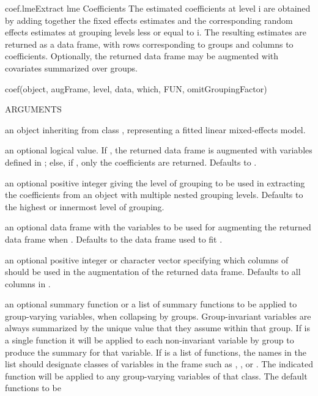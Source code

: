 \documentclass[pdftex]{article} \usepackage{url,graphicx}
\begin{document}
\begin{Helpfile}{coef.lme}{Extract lme Coefficients}
The estimated coefficients at level i are obtained by adding
together the fixed effects estimates and the corresponding random
effects estimates at grouping levels less or equal to i. The
resulting estimates are returned as a data frame, with rows
corresponding to groups and columns to coefficients. Optionally, the
returned data frame may be augmented with covariates summarized over
groups.
\begin{Example}
coef(object, augFrame, level, data, which, FUN, omitGroupingFactor)
\end{Example}
\begin{Argument}{ARGUMENTS}
\item[\Co{object:}]
an object inheriting from class , representing
a fitted linear mixed-effects model.
\item[\Co{augFrame:}]
an optional logical value. If , the returned
data frame is augmented with variables defined in ; else,
if , only the coefficients are returned. Defaults to
.
\item[\Co{level:}]
an optional positive integer giving the level of grouping
to be used in extracting the coefficients from an object with
multiple nested grouping levels. Defaults to the highest or innermost
level of grouping.
\item[\Co{data:}]
an optional data frame with the variables to be used for
augmenting the returned data frame when . Defaults
to the data frame used to fit . 
\item[\Co{which:}]
an optional positive integer or character vector specifying which
columns of  should be used in the augmentation of the
returned data frame. Defaults to all columns in .
\item[\Co{FUN:}]
an optional summary function or a list of summary functions
to be applied to group-varying variables, when collapsing 
by groups.  Group-invariant variables are always summarized by the
unique value that they assume within that group. If  is a
single function it will be applied to each non-invariant variable by
group to produce the summary for that variable.  If  is a
list of functions, the names in the list should designate classes of
variables in the frame such as , , or
.  The indicated function will be applied to any
group-varying variables of that class.  The default functions to be

\end{Argument}
\end{Helpfile}
\end{document}
